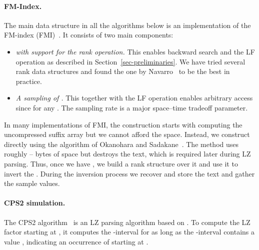 \documentclass[runningheads]{llncs}
\begin{document}
{\paragraph{FM-Index.} The main data structure in all the algorithms
below is an
implementation of the FM-index (FMI)~\cite{fm2005}. It consists of two
main components:
\begin{itemize}
\item \textit{ with support for the rank operation.} This enables
  backward search and the LF operation as described in
  Section~\ref{sec-preliminaries}. We have tried several rank data
  structures and found the one by
  Navarro~\cite[Sect.~7.1]{nav2004} to be the best in practice.
\item \textit{A sampling of .} This together with the LF
  operation enables arbitrary  access since
   for any .
  The sampling rate is a major space--time tradeoff parameter.
\end{itemize}
In many implementations of FMI, the construction starts with computing
the uncompressed suffix array but we cannot afford the space.
Instead, we construct  directly using the algorithm of
Okanohara and Sadakane~\cite{os2009}.
The method uses
roughly -- bytes of space
but destroys the text, which is required later during LZ
parsing. Thus, once we have , we build a rank structure over it
and use it to invert the . During the inversion process we
recover and store the text and gather the  sample values.

\paragraph{CPS2 simulation.} The CPS2 algorithm~\cite{cps2008} is an
LZ parsing algorithm based on . To compute the LZ factor
starting at , it computes the -interval for
 as long as the -interval contains a
value , indicating an occurrence of  starting at .

}
\end{document}
